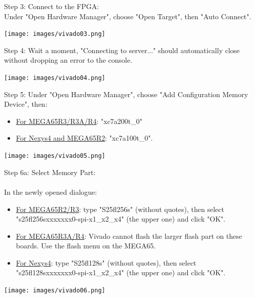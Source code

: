 \begin{minipage}{\linewidth}
  Step 3: Connect to the FPGA: \\
  Under "Open Hardware Manager", choose "Open Target", then "Auto Connect".
  \\
  \begin{center}
    \texttt{[image: images/vivado03.png]}
  \end{center}
\end{minipage}

\vspace{5mm}

\begin{minipage}{\linewidth}
  Step 4: Wait a moment, "Connecting to server..."  should
  automatically close without dropping an error to the console.
  \\
  \begin{center}
    \texttt{[image: images/vivado04.png]}
  \end{center}
\end{minipage}


\begin{minipage}{\linewidth}
  Step 5: Under "Open Hardware Manager", choose "Add Configuration
  Memory Device", then:
  \begin{itemize}
    \item \underline{For MEGA65R3/R3A/R4}: "xc7a200t\_0"
    \item \underline{For Nexys4 and MEGA65R2}: "xc7a100t\_0".
  \end{itemize}

  \begin{center}
    \texttt{[image: images/vivado05.png]}
  \end{center}
\end{minipage}

\vspace{5mm}

\begin{minipage}{\linewidth}
  Step 6a: Select Memory Part: \\
  \\
  In the newly opened dialogue:
  \begin{itemize}
    \item \underline{For MEGA65R2/R3}: type "S25fl256s"
    (without quotes), then select "s25fl256sxxxxxxx0-spi-x1\_x2\_x4"
    (the upper one) and click "OK".
    \item \underline{For MEGA65R3A/R4}: Vivado cannot flash the larger flash part on these boards. Use the flash menu on the MEGA65.
    \item \underline{For Nexys4}: type "S25fl128s"
    (without quotes), then select "s25fl128sxxxxxxx0-spi-x1\_x2\_x4"
    (the upper one) and click "OK".
  \end{itemize}

  \begin{center}
    \texttt{[image: images/vivado06.png]}
  \end{center}
\end{minipage}

